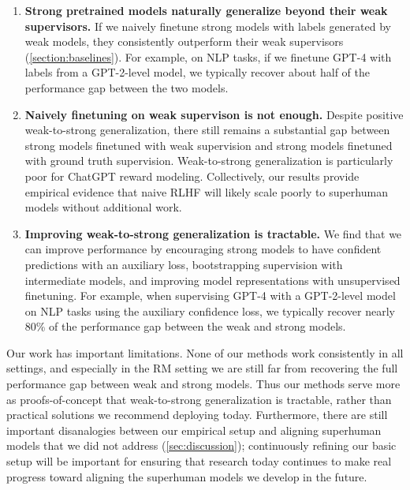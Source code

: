 \begin{enumerate}

\item \textbf{Strong pretrained models naturally generalize beyond their weak supervisors.} If we naively finetune strong models with labels generated by weak models, they consistently outperform their weak supervisors (\ref{section:baselines}). For example, on NLP tasks, if we finetune GPT-4 with labels from a GPT-2-level model, we typically recover about half of the performance gap between the two models.

\item \textbf{Naively finetuning on weak supervison is not enough.} Despite positive weak-to-strong generalization, there still remains a substantial gap between strong models finetuned with weak supervision and strong models finetuned with ground truth supervision. Weak-to-strong generalization is particularly poor for ChatGPT reward modeling. Collectively, our results provide empirical evidence that naive RLHF will likely scale poorly to superhuman models without additional work.  

\item \textbf{Improving weak-to-strong generalization is tractable.} We find that we can improve performance by encouraging strong models to have confident predictions with an auxiliary loss, bootstrapping supervision with intermediate models, and improving model representations with unsupervised finetuning. For example, when supervising GPT-4 with a GPT-2-level model on NLP tasks using the auxiliary confidence loss, we typically recover nearly 80\% of the performance gap between the weak and strong models.

\end{enumerate}

Our work has important limitations. None of our methods work consistently in all settings, and especially in the RM setting we are still far from recovering the full performance gap between weak and strong models. Thus our methods serve more as proofs-of-concept that weak-to-strong generalization is tractable, rather than practical solutions we recommend deploying today. Furthermore, there are still important disanalogies between our empirical setup and aligning superhuman models that we did not address (\ref{sec:discussion}); continuously refining our basic setup will be important for ensuring that research today continues to make real progress toward aligning the superhuman models we develop in the future.

